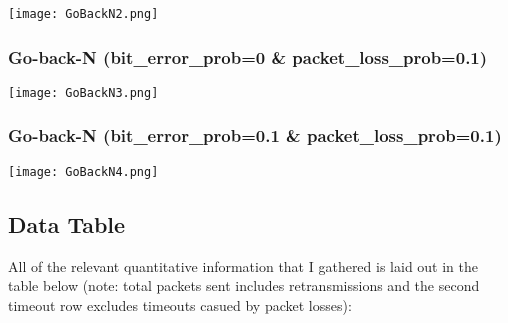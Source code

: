 \documentclass{article}
\begin{document}
\begin{center}
    \texttt{[image: GoBackN2.png]}
\end{center}

\subsubsection{Go-back-N (bit\_error\_prob=0 \& packet\_loss\_prob=0.1)}

\begin{center}
    \texttt{[image: GoBackN3.png]}
\end{center}

\subsubsection{Go-back-N (bit\_error\_prob=0.1 \& packet\_loss\_prob=0.1)}

\begin{center}
    \texttt{[image: GoBackN4.png]}
\end{center}

\subsection{Data Table}

All of the relevant quantitative information that I gathered is laid out in the table below (note: total packets sent includes retransmissions and the second timeout row excludes timeouts casued by packet losses):
\end{document}
